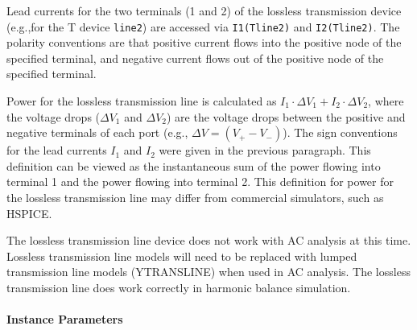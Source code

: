 \begin{Device}
Lead currents for the two terminals (1 and 2) of the lossless transmission device 
(e.g.,for the T device \texttt{line2}) are accessed via \texttt{I1(Tline2)} and 
\texttt{I2(Tline2)}.  The polarity conventions are that positive current flows into
the positive node of the specified terminal, and negative current flows out of the
positive node of the specified terminal.

Power for the lossless transmission line is calculated as $I_1 \cdot \Delta V_1 + 
I_2 \cdot \Delta V_2$, where the voltage drops ($\Delta V_1$ and $\Delta V_2$) are the 
voltage drops between the positive and negative terminals of each port (e.g., 
$\Delta V = (V_+ - V_-)$).  The sign conventions for the lead currents $I_1$ and $I_2$ 
were given in the previous paragraph.  This definition can be viewed as the instantaneous
sum of the power flowing into terminal 1 and the power flowing into terminal 2.
This definition for power for the lossless transmission line may differ from 
commercial simulators, such as HSPICE.  

The lossless transmission line device does not work with AC analysis
at this time.  Lossless transmission line models will need to be
replaced with lumped transmission line models (YTRANSLINE) when used
in AC analysis.  The lossless transmission line does work correctly in
harmonic balance simulation.

\end{Device}

\paragraph{Instance Parameters}

